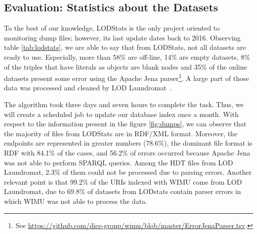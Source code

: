 \subsection{Evaluation: Statistics about the Datasets}\label{ev:wimu}


To the best of our knowledge, LODStats\cite{auer2012lodstats} is the only project oriented to monitoring dump files; however, its last update dates back to 2016. 
Observing table \ref{tab:lodstats}, we are able to say that from LODStats, not all datasets are ready to use.
Especially, more than 58\% are off-line, 14\% are empty datasets, 8\% of the triples that have literals as objects are blank nodes and 35\% of the online datasets present some error using the Apache Jena parser\footnote{See \url{https://github.com/dice-group/wimu/blob/master/ErrorJenaParser.tsv}.}. 
A large part of those data was processed and cleaned by LOD Laundromat~\cite{beek2014lod}.


\setlength{\tabcolsep}{0.5em} %
\begin{table}[H]
	\centering
	\caption{Datasets.}
	\label{tab:lodstats}
\end{table}

The algorithm took three days and seven hours to complete the task. 
Thus, we will create a scheduled job to update our database index once a month.
With respect to the information present in the figure \ref{fig:dumps}, we can observe that the majority of files from LODStats are in RDF/XML format.
Moreover, the endpoints are represented in greater numbers (78.6\%), the dominant file format is RDF with 84.1\% of the cases, and 56.2\% of errors occurred because Apache Jena was not able to perform SPARQL queries.
Among the HDT files from LOD Laundromat, 2.3\% of them could not be processed due to parsing errors.
Another relevant point is that 99.2\% of the URIs indexed with WIMU come from LOD Laundromat, due to 69.8\% of datasets from LODstats contain parser errors in which WIMU was not able to process the data.

